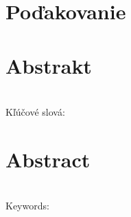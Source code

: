 \documentclass[12pt, a4paper, oneside]{book}
\begin{document}
\chapter*{Poďakovanie}\label{chap:thank_you}

\vfill\eject 

\chapter*{Abstrakt}\label{chap:abstract_sk}

~\\
Kľúčové slová:
\vfill\eject 

\chapter*{Abstract}\label{chap:abstract_en}

~\\
Keywords:
\vfill\eject 

\tableofcontents

\mainmatter










\backmatter

\nocite{*}



\listoffigures
\end{document}
